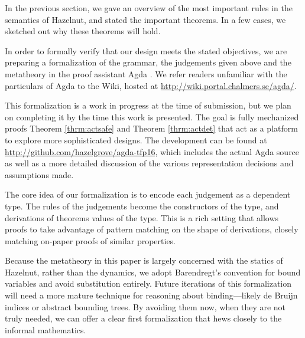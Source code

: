 In the previous section, we gave an overview of the most important rules in
the semantics of Hazelnut, and stated the important theorems. In a few
cases, we sketched out why these theorems will hold.

In order to formally verify that our design meets the stated objectives, we
are preparing a formalization of the grammar, the judgements given above
and the metatheory in the proof assistant Agda \cite{norell:thesis}. We
refer readers unfamiliar with the particulars of Agda to the Wiki, hosted
at \url{http://wiki.portal.chalmers.se/agda/}.

This formalization is a work in progress at the time of submission, but we
plan on completing it by the time this work is presented. The goal is fully
mechanized proofs Theorem \ref{thrm:actsafe} and Theorem \ref{thrm:actdet}
that act as a platform to explore more sophisticated designs. The
development can be found at
\url{http://github.com/hazelgrove/agda-tfp16}, which includes the actual Agda
source as well as a more detailed discussion of the various representation
decisions and assumptions made.

The core idea of our formalization is to encode each judgement as a
dependent type. The rules of the judgements become the constructors of the
type, and derivations of theorems values of the type. This is a rich
setting that allows proofs to take advantage of pattern matching on the
shape of derivations, closely matching on-paper proofs of similar
properties.

Because the metatheory in this paper is largely concerned with the statics
of Hazelnut, rather than the dynamics, we adopt Barendregt's convention for
bound variables and avoid substitution entirely.\cite{urban} Future
iterations of this formalization will need a more mature technique for
reasoning about binding---likely de Bruijn indices or abstract bounding
trees.\cite{} \cite{} By avoiding them now, when they are not truly needed,
we can offer a clear first formalization that hews closely to the informal
mathematics.
